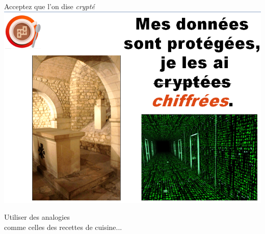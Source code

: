 \documentclass{beamer}
\begin{document}
\begin{frame}
\begin{center}
\Huge{Acceptez que l'on dise \emph{crypté}}
\includegraphics[scale=0.5]{./images/chiffrees_vs_cryptees.png}
\end{center}
\end{frame}

\begin{frame}
\begin{center}
\Huge{Utiliser des analogies \\comme celles des recettes de cuisine...}
\end{center}
\end{frame}
\end{document}
